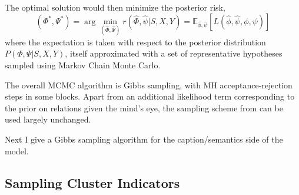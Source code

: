 \documentclass[12pt]{article}
\begin{document}
The optimal solution would then minimize the posterior risk, 
\begin{equation*}
(\Phi^*, \Psi^*) = \arg\min_{(\hat{\Phi}, \hat{\Psi})} r(\hat{\Phi}, \hat{\psi} \vert S,X,Y) = \mathbb{E}_{\hat{\phi},\hat{\psi}}[L(\hat{\phi}, \hat{\psi}, \phi, \psi)]
\end{equation*}
where the expectation is taken with respect to the posterior distribution $P(\Phi, \Psi \vert S,X,Y)$, itself approximated with a set of representative hypotheses sampled using Markov Chain Monte Carlo.

The overall MCMC algorithm is Gibbs sampling, with MH acceptance-rejection steps in some blocks.  Apart from an additional likelihood term corresponding to the prior on relations given the mind's eye, the sampling scheme from \cite{delpero2012bayesian} can be used largely unchanged.

Next I give a Gibbs sampling algorithm for the caption/semantics side of the model.

\subsection{Sampling Cluster Indicators}
\end{document}
